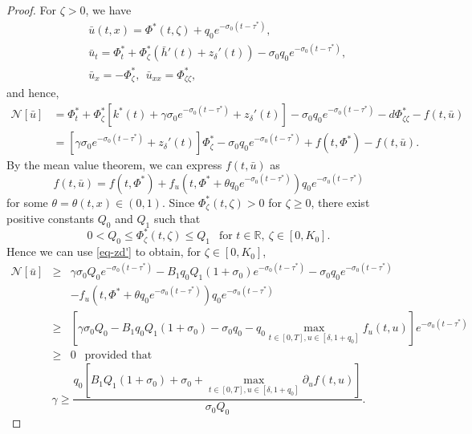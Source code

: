 \documentclass[11pt]{amsart}
\numberwithin{equation}{section}
\begin{document}
\begin{proof}
For $\zeta>0$, we have
\begin{eqnarray*}
&& \bar{u}(t,x)=\Phi^*(t, \zeta)+q_0e^{-\sigma_0(t-\tau^{*})},\\
 &&\bar{u}_t=\Phi_t^*+\Phi_\zeta^*(\bar{h}'(t)+z_\delta'(t))-\sigma_0q_0e^{-\sigma_0(t-\tau^{*})},\\
 &&\bar{u}_x=- \Phi_\zeta^*,  ~~ \bar{u}_{xx}=\Phi_{\zeta\zeta}^*,
\end{eqnarray*}
and  hence,
\begin{equation}\label{Nu^2}
\begin{aligned}
 \mathcal{N}[\bar{u}]&= \Phi_t^*+\Phi_\zeta^*[k^*(t)+\gamma\sigma_0e^{-\sigma_0(t-\tau^{*})}+z_\delta'(t)]-\sigma_0q_0e^{-\sigma_0(t-\tau^{*})}-d \Phi_{\zeta\zeta}^*-f(t,\bar{u})\\
&=[\gamma\sigma_0e^{-\sigma_0(t-\tau^{*})}+z_\delta'(t)]\Phi_\zeta^*-\sigma_0q_0e^{-\sigma_0(t-\tau^{*})}+f(t,\Phi^*)-f(t,\bar{u}).
\end{aligned}
\end{equation}
By the mean value theorem, we can express \(f(t, \bar{u})\) as  
\begin{equation*}
  f(t,\bar{u})=f(t,\Phi^*)+f_u(t,\Phi^*+\theta q_0e^{-\sigma_0(t-\tau^{*})})q_0e^{-\sigma_0(t-\tau^{*})}
\end{equation*}
for some $\theta=\theta(t,x)\in(0,1)$. 
Since  $\Phi^*_\zeta(t,\zeta)>0$ for $\zeta\geq 0$, there exist positive constants  $Q_0$   and $Q_1$ such that
 \begin{equation*}
  0<Q_0\leq \Phi^*_\zeta(t,\zeta)\leq Q_1 ~~\text{ for }t\in\mathbb{R},\ \zeta\in[0,K_0].
 \end{equation*}
 Hence we can use \eqref{eq-zd'} to obtain, for $\zeta\in[0,K_0]$,
\begin{eqnarray*}
  \mathcal{N}[\bar{u}]
  &\geq& \gamma\sigma_0Q_0e^{-\sigma_0(t-\tau^{*})}-B_1q_0Q_1(1+\sigma_0)e^{-\sigma_0(t-\tau^*)}-\sigma_0q_0e^{-\sigma_0(t-\tau^{*})}\\
  &&-f_u(t,\Phi^*+\theta q_0e^{-\sigma_0(t-\tau^{*})})q_0e^{-\sigma_0(t-\tau^{*})}\\
&\geq& \left[\gamma\sigma_0Q_0-B_1q_0Q_1(1+\sigma_0)-\sigma_0q_0-q_0\max_{t\in[0,T],u\in[\delta,1+q_0]}f_u(t,u)\right]e^{-\sigma_0(t-\tau^{*})}\\
&\geq& 0\ \ \mbox{ provided that }
\end{eqnarray*}
\begin{equation}\label{eq-gq3}
  \gamma\geq \frac{q_0\left[B_1Q_1(1+\sigma_0)+\sigma_0+\max_{t\in[0,T],u\in[\delta,1+q_0]}\partial_uf(t,u)\right]}{\sigma_0Q_0}.
\end{equation}


\end{proof}
\end{document}
